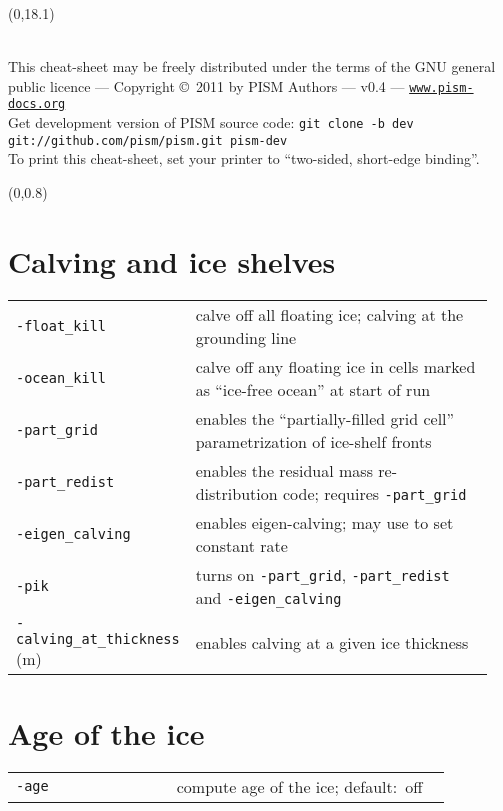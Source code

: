 \documentclass[landscape]{article}
\newcommand{\PISMDOWNLOADMSG}{Get development version of PISM source code: \texttt{git clone -b dev git://github.com/pism/pism.git pism-dev}}
\begin{document}
\null\newpage
\begin{textblock}{47}(0,18.1)
  \begin{center}
    \hrulefill\\
    This cheat-sheet may be freely distributed under the terms of the GNU general
    public licence --- Copyright \copyright\ 2011 by PISM Authors --- v0.4 ---
    \href{http://www.pism-docs.org}{\texttt{www.pism-docs.org}}\\
    \PISMDOWNLOADMSG\\
    To print this cheat-sheet, set your printer to ``two-sided, short-edge binding''.
 \end{center}
\end{textblock}

\begin{textblock}{15}(0,0.8)

\section{Calving and ice shelves}
\label{sec:calving}
\begin{tabular}{@{}p{0.3\linewidth}p{0.65\linewidth}@{}}
  \texttt{-float_kill} & calve off all floating ice; calving at the grounding
  line\\
\texttt{-ocean_kill} & calve off any floating ice in cells marked as ``ice-free
ocean'' at start of run\\
\texttt{-part_grid} & enables the ``partially-filled grid cell''
parametrization of ice-shelf fronts\\
\texttt{-part_redist} & enables the residual mass re-distribution code; requires \texttt{-part_grid}\\
\texttt{-eigen_calving} & enables eigen-calving; may use to set constant rate \\
\texttt{-pik} & turns on \texttt{-part_grid}, \texttt{-part_redist} and
\texttt{-eigen_calving}\\
\texttt{-calving_at_thickness} (m) & enables calving at a given ice thickness\\
\end{tabular}

\section{Age of the ice}
\label{sec:age}
\begin{tabular}{@{}p{0.35\linewidth}p{0.6\linewidth}@{}}
\texttt{-age} & compute age of the ice; \mbox{default: off}\\
\end{tabular}


\end{textblock}
\end{document}
